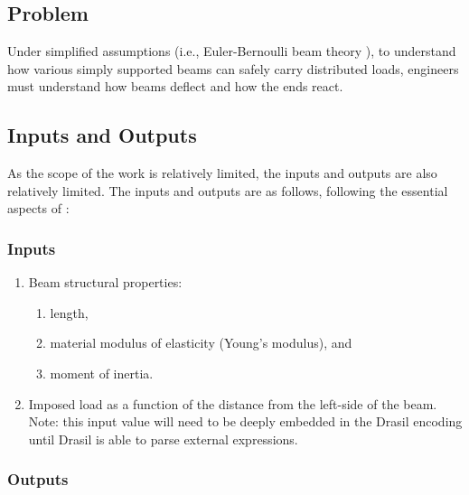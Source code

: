 \documentclass{article}
\begin{document}
\subsection{Problem}
\label{problem-statement:problem}

Under simplified assumptions (i.e., Euler-Bernoulli beam theory
\cite{EulerBernoulliWiki}), to understand how various simply supported beams can
safely carry distributed loads, engineers must understand how beams deflect and
how the ends react.

\subsection{Inputs and Outputs}
\label{problem-statement:inputs-and-outputs}

As the scope of the work is relatively limited, the inputs and outputs are also
relatively limited. The inputs and outputs are as follows, following the
essential aspects of \cite{Lemonis2022}:

\subsubsection{Inputs}
\label{problem-statement:inputs-and-outputs:inputs}

\begin{enumerate}
    \item Beam structural properties:
          \begin{enumerate}
              \item length,
              \item material modulus of elasticity (Young's modulus), and
              \item moment of inertia.
          \end{enumerate}
    \item Imposed load as a function of the distance from the left-side of the
          beam. Note: this input value will need to be deeply embedded in the
          Drasil encoding until Drasil is able to parse external expressions.
\end{enumerate}

\subsubsection{Outputs}
\end{document}
